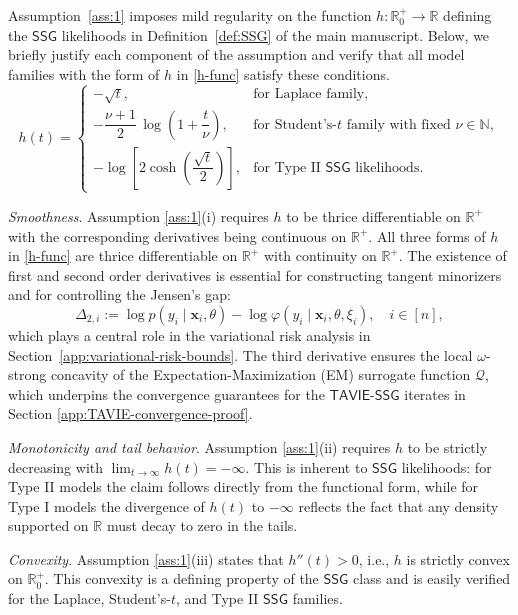 \documentclass[12pt]{article}
\numberwithin{equation}{section}
\newcommand{\ssg}{\mathsf{SSG}}
\newcommand{\tssg}{\mathsf{TAVIE}\text{-}\mathsf{SSG}}
\begin{document}
Assumption~\ref{ass:1} imposes mild regularity on the function $h: \mathbb{R}_{0}^{+} \to \mathbb{R}$ defining the $\ssg$ likelihoods in Definition~\ref{def:SSG} of the main manuscript. Below, we briefly justify each component of the assumption and verify that all model families with the form of $h$ in \eqref{h-func} satisfy these conditions.
%
\begin{equation}
\label{h-func}
h(t)=
\begin{cases}
-\sqrt{t}, & \text{for Laplace family},\\[6pt]
-\dfrac{\nu+1}{2}\,\log\!\left(1+\dfrac{t}{\nu}\right), 
& \text{for Student's-$t$ family with fixed }\nu\in\mathbb{N},\\[10pt]
-\log\!\left[2\cosh\!\left(\dfrac{\sqrt{t}}{2}\right)\right], 
& \text{for Type II $\ssg$ likelihoods}.
\end{cases}
\end{equation}

\noindent
\emph{Smoothness}. { Assumption \ref{ass:1}(i) requires $h$ to be thrice differentiable on $\mathbb{R}^{+}$ with the corresponding  derivatives being continuous on $\mathbb{R}^{+}$}. All three forms of $h$ in \eqref{h-func} are thrice differentiable on $\mathbb{R}^{+}$ with continuity on $\mathbb{R}^{+}$. The existence of first and second order derivatives is essential for constructing tangent minorizers and for controlling the Jensen's gap:
$$
\Delta_{2, i} := \log p(y_i\mid \mathbf{x}_i,\theta) - \log \varphi(y_i\mid \mathbf{x}_i, \theta, \xi_i), \quad i\in [n], 
$$
which plays a central role in the variational risk analysis in Section~\ref{app:variational-risk-bounds}. The third derivative ensures the local $\omega$-strong concavity of the Expectation-Maximization (EM) surrogate function $\mathcal{Q}$, which underpins the convergence guarantees for the $\tssg$ iterates in Section \ref{app:TAVIE-convergence-proof}.

\noindent
\emph{Monotonicity and tail behavior}. Assumption \ref{ass:1}(ii) requires $h$ to be strictly decreasing with $\lim_{t\to \infty}h(t) = -\infty$. This is inherent to $\ssg$ likelihoods: for Type II models the claim follows directly from the functional form, while for Type I models the divergence of $h(t)$ to $-\infty$ reflects the fact that any density supported on $\mathbb{R}$ must decay to zero in the tails.

\noindent
\emph{Convexity}. Assumption \ref{ass:1}(iii) states that $h''(t) > 0$, i.e., $h$ is strictly convex on $\mathbb{R}_0^{+}$. This convexity is a defining property of the $\ssg$ class and is easily verified for the Laplace, Student's-$t$, and Type II $\ssg$ families.
\end{document}
